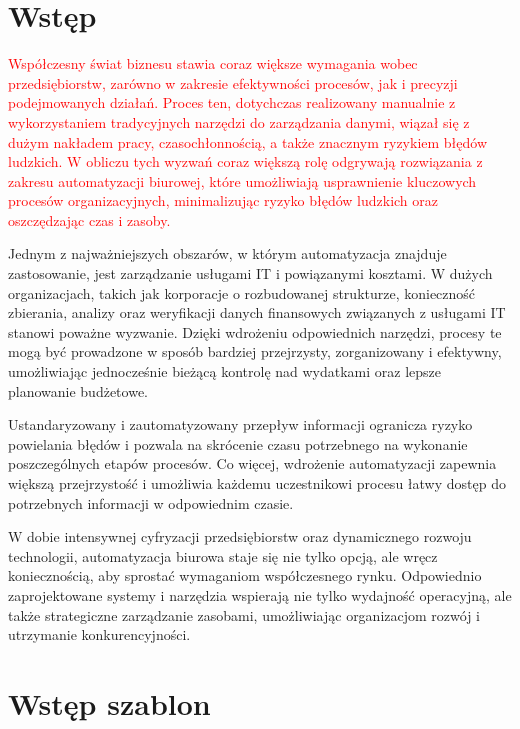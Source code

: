 \chapter{Wstęp}

    \textcolor{red}{Współczesny świat biznesu stawia coraz większe wymagania wobec przedsiębiorstw, zarówno w zakresie efektywności procesów, jak i precyzji podejmowanych działań. Proces ten, dotychczas realizowany manualnie z wykorzystaniem tradycyjnych narzędzi do zarządzania danymi, wiązał się z dużym nakładem pracy, czasochłonnością, a także znacznym ryzykiem błędów ludzkich. W obliczu tych wyzwań coraz większą rolę odgrywają rozwiązania z zakresu automatyzacji biurowej, które umożliwiają usprawnienie kluczowych procesów organizacyjnych, minimalizując ryzyko błędów ludzkich oraz oszczędzając czas i zasoby.} \par Jednym z najważniejszych obszarów, w którym automatyzacja znajduje zastosowanie, jest zarządzanie usługami IT i powiązanymi kosztami. W dużych organizacjach, takich jak korporacje o rozbudowanej strukturze, konieczność zbierania, analizy oraz weryfikacji danych finansowych związanych z usługami IT stanowi poważne wyzwanie. Dzięki wdrożeniu odpowiednich narzędzi, procesy te mogą być prowadzone w sposób bardziej przejrzysty, zorganizowany i efektywny, umożliwiając jednocześnie bieżącą kontrolę nad wydatkami oraz lepsze planowanie budżetowe. \par{
    Ustandaryzowany i zautomatyzowany przepływ informacji ogranicza ryzyko powielania błędów i pozwala na skrócenie czasu potrzebnego na wykonanie poszczególnych etapów procesów. Co więcej, wdrożenie automatyzacji zapewnia większą przejrzystość i umożliwia każdemu uczestnikowi procesu łatwy dostęp do potrzebnych informacji w odpowiednim czasie. \par W dobie intensywnej cyfryzacji przedsiębiorstw oraz dynamicznego rozwoju technologii, automatyzacja biurowa staje się nie tylko opcją, ale wręcz koniecznością, aby sprostać wymaganiom współczesnego rynku. Odpowiednio zaprojektowane systemy i narzędzia wspierają nie tylko wydajność operacyjną, ale także strategiczne zarządzanie zasobami, umożliwiając organizacjom rozwój i utrzymanie konkurencyjności.}



\chapter{Wstęp szablon}

